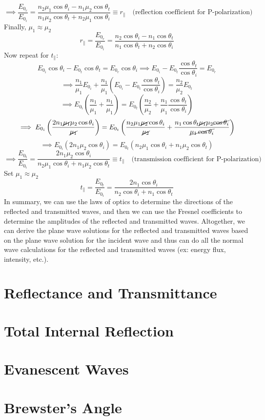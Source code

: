 \documentclass[12pt]{article}
\begin{document}
\[\implies \boxed{\frac{E_{0_r}}{E_{0_i}} = \frac{n_2 \mu_1 \cos\theta_i - n_1 \mu_2 \cos\theta_t}{n_1 \mu_2 \cos\theta_t + n_2 \mu_1 \cos\theta_i} \equiv r_{\parallel} \quad \text{(reflection coefficient for P-polarization)}}\]
Finally, $\mu_1 \approx \mu_2$
\[\boxed{r_{\parallel} = \frac{E_{0_r}}{E_{0_i}} = \frac{n_2 \cos\theta_i - n_1 \cos\theta_t}{n_1 \cos\theta_t + n_2 \cos\theta_i}}\]
Now repeat for $t_{\parallel}$:
\[E_{0_i} \cos\theta_i - E_{0_t} \cos\theta_t = E_{0_r} \cos\theta_i \implies E_{0_i} - E_{0_t} \frac{\cos\theta_t}{\cos\theta_i} = E_{0_r}\]
\[\implies \frac{n_1}{\mu_1} E_{0_i} + \frac{n_1}{\mu_1} \left( E_{0_i} - E_{0_t} \frac{\cos\theta_t}{\cos\theta_i} \right) = \frac{n_2}{\mu_2} E_{0_t}\]
\[\implies E_{0_i} \left( \frac{n_1}{\mu_1} + \frac{n_1}{\mu_1} \right) = E_{0_t} \left( \frac{n_2}{\mu_2} + \frac{n_1}{\mu_1} \frac{\cos\theta_t}{\cos\theta_i} \right)\]
\[\implies E_{0_i} \left( \frac{2n_1 \cancel{\mu_1} \mu_2 \cos\theta_i}{\cancel{\mu_1}} \right) = E_{0_t} \left( \frac{n_2 \mu_1 \cancel{\mu_2} \cos\theta_i}{\cancel{\mu_2}} + \frac{n_1 \cos\theta_t \cancel{\mu_1} \mu_2 \cancel{\cos\theta_i}}{\cancel{\mu_1 \cos\theta_i}} \right)\]
\[\implies E_{0_i} (2n_1 \mu_2 \cos\theta_i) = E_{0_t} (n_2 \mu_1 \cos\theta_i + n_1 \mu_2 \cos\theta_t)\]
\[\implies \boxed{\frac{E_{0_t}}{E_{0_i}} = \frac{2n_1 \mu_2 \cos\theta_i}{n_2 \mu_1 \cos\theta_i + n_1 \mu_2 \cos\theta_t}\equiv t_\parallel \quad \text{(transmission coefficient for P-polarization)}}\]
Set $\mu_1 \approx \mu_2$
\[\boxed{t_{\parallel} = \frac{E_{0_t}}{E_{0_i}} = \frac{2n_1 \cos\theta_i}{n_2 \cos\theta_i + n_1 \cos\theta_t}}\]
In summary, we can use the laws of optics to determine the directions of the reflected and transmitted waves, and then we can use the Fresnel coefficients to determine the amplitudes of the reflected and transmitted waves. Altogether, we can derive the plane wave solutions for the reflected and transmitted waves based on the plane wave solution for the incident wave and thus can do all the normal wave calculations for the reflected and transmitted waves (ex: energy flux, intensity, etc.).
\section*{Reflectance and Transmittance}
\section*{Total Internal Reflection}
\section*{Evanescent Waves}
\section*{Brewster's Angle}
\end{document}
